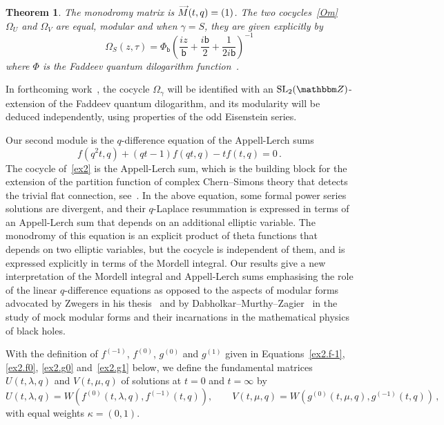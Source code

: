\documentclass[12pt,reqno]{amsart}
\newtheorem{theorem}{Theorem}[section]
\theoremstyle{definition}
\def\BZ{\mathbbm Z}
\def\ti{\widetilde}
\def\SL{\mathrm{SL}}
\def\be{\begin{equation}}
\def\ee{\end{equation}}
\def\sfb{\mathsf{b}}
\def\Om{\Omega}
\def\vM{\accentset{\longrightarrow}{M}}
\def\sfb{\mathsf{b}}
\begin{document}
\begin{theorem}
\label{thm.ex1}
The monodromy matrix is $\vM(t,q)=(1)$. The two cocycles~\eqref{Om} $\Om_U$
and $\Om_V$ are equal, modular and when $\gamma=S$, they are given explicitly by
\be
\Om_{S}(z,\tau) = %
\Phi_{\sfb}\left(\frac{iz}{\sfb}
  +\frac{i\sfb}{2}+\frac{1}{2i\sfb}\right)^{-1}
\ee
where $\Phi$ is the Faddeev quantum dilogarithm function~\cite{Faddeev, FK-QDL}.
\end{theorem}
  
In forthcoming work~\cite{GKZ:cocycle}, the cocycle $\Om_\gamma$ will be
identified with an $\SL_2(\BZ)$-extension of the Faddeev quantum dilogarithm,
and its modularity will be deduced independently, using properties of the
odd Eisenstein series. 

Our second module is the $q$-difference equation of the Appell-Lerch sums
\be
\label{ex2}
f(q^2t,q)+(qt-1)f(qt,q)-tf(t,q)=0 \,.
\ee
The cocycle of~\eqref{ex2} is the Appell-Lerch sum, which is the building block
for the extension of the partition function of complex Chern--Simons theory
that detects the trivial flat connection, see~\cite{GGMW:trivial}.
In the above equation, some formal power series solutions are divergent, and their 
$q$-Laplace resummation is expressed in terms of an Appell-Lerch sum that depends
on an additional elliptic variable. The monodromy of this equation is an explicit
product of theta functions that depends on two elliptic variables, but the cocycle
is independent of them, and is expressed explicitly in terms of the Mordell
integral. Our results give a new interpretation of the Mordell integral and
Appell-Lerch sums emphasising the role of the linear $q$-difference equations
as opposed to the aspects of modular forms advocated by Zwegers in his
thesis~\cite{Zwegersthesis} and by Dabholkar--Murthy--Zagier~\cite{DMZ:blackholes}
in the study of mock modular forms and their incarnations in the mathematical
physics of black holes.

With the definition of $f^{(-1)}$, $f^{(0)}$, $g^{(0)}$ and $g^{(1)}$ given in
Equations~\eqref{ex2.f-1}, \eqref{ex2.f0}, \eqref{ex2.g0} and~\eqref{ex2.g1}
below, we define the fundamental matrices $U(t,\lambda,q)$ and $V(t,\mu,q)$
of solutions at $t=0$ and $t=\infty$ by 
\be
\label{UVex2}
U(t,\lambda,q) = W(f^{(0)}(t,\lambda,q), f^{(-1)}(t,q)), \qquad
V(t,\mu,q) = W(g^{(0)}(t,\mu,q), g^{(-1)}(t,q)) \,,
\ee
with equal weights $\kappa=(0,1)$.
\end{document}
